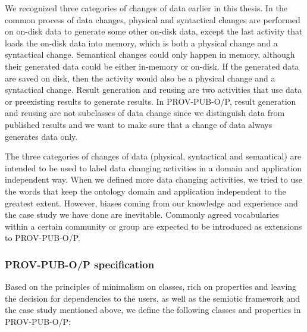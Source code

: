 We recognized three categories of changes of data earlier in this thesis. In the common process of data changes, physical and syntactical changes are performed on on-disk data to generate some other on-disk data, except the last activity that loads the on-disk data into memory, which is both a physical change and a syntactical change. Semantical changes could only happen in memory, although their generated data could be either in-memory or on-disk. If the generated data are saved on disk, then the activity would also be a physical change and a syntactical change. Result generation and reusing are two activities that use data or preexisting results to generate results. In PROV-PUB-O/P, result generation and reusing are not subclasses of data change since we distinguish data from published results and we want to make sure that a change of data always generates data only. 

The three categories of changes of data (physical, syntactical and semantical) are intended to be used to label data changing activities in a domain and application independent way. When we defined more data changing activities, we tried to use the words that keep the ontology domain and application independent to the greatest extent. However, biases coming from our knowledge and experience and the case study we have done are inevitable. Commonly agreed vocabularies within a certain community or group are expected to be introduced as extensions to PROV-PUB-O/P.

\subsubsection{PROV-PUB-O/P specification}
Based on the principles of minimalism on classes, rich on properties and leaving the decision for dependencies to the users, as well as the semiotic framework and the case study mentioned above, we define the following classes and properties in PROV-PUB-O/P:

